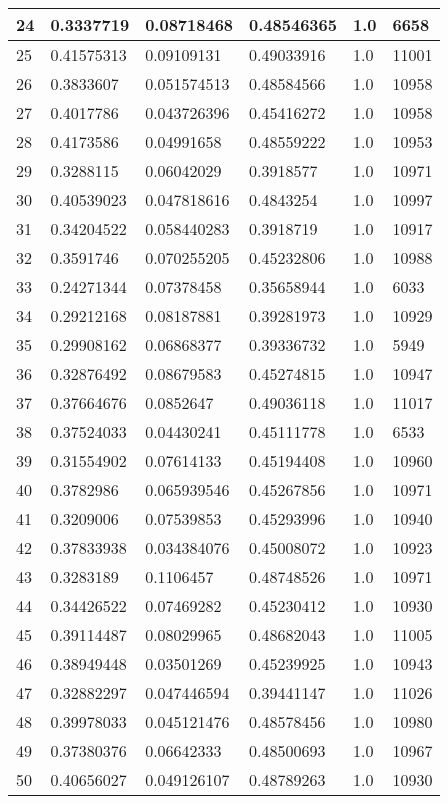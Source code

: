 \begin{longtable}{|l|l|l|l|l|l|}
24 & 0.3337719 & 0.08718468 & 0.48546365 & 1.0 & 6658 \\ \hline 
25 & 0.41575313 & 0.09109131 & 0.49033916 & 1.0 & 11001 \\ \hline 
26 & 0.3833607 & 0.051574513 & 0.48584566 & 1.0 & 10958 \\ \hline 
27 & 0.4017786 & 0.043726396 & 0.45416272 & 1.0 & 10958 \\ \hline 
28 & 0.4173586 & 0.04991658 & 0.48559222 & 1.0 & 10953 \\ \hline 
29 & 0.3288115 & 0.06042029 & 0.3918577 & 1.0 & 10971 \\ \hline 
30 & 0.40539023 & 0.047818616 & 0.4843254 & 1.0 & 10997 \\ \hline 
31 & 0.34204522 & 0.058440283 & 0.3918719 & 1.0 & 10917 \\ \hline 
32 & 0.3591746 & 0.070255205 & 0.45232806 & 1.0 & 10988 \\ \hline 
33 & 0.24271344 & 0.07378458 & 0.35658944 & 1.0 & 6033 \\ \hline 
34 & 0.29212168 & 0.08187881 & 0.39281973 & 1.0 & 10929 \\ \hline 
35 & 0.29908162 & 0.06868377 & 0.39336732 & 1.0 & 5949 \\ \hline 
36 & 0.32876492 & 0.08679583 & 0.45274815 & 1.0 & 10947 \\ \hline 
37 & 0.37664676 & 0.0852647 & 0.49036118 & 1.0 & 11017 \\ \hline 
38 & 0.37524033 & 0.04430241 & 0.45111778 & 1.0 & 6533 \\ \hline 
39 & 0.31554902 & 0.07614133 & 0.45194408 & 1.0 & 10960 \\ \hline 
40 & 0.3782986 & 0.065939546 & 0.45267856 & 1.0 & 10971 \\ \hline 
41 & 0.3209006 & 0.07539853 & 0.45293996 & 1.0 & 10940 \\ \hline 
42 & 0.37833938 & 0.034384076 & 0.45008072 & 1.0 & 10923 \\ \hline 
43 & 0.3283189 & 0.1106457 & 0.48748526 & 1.0 & 10971 \\ \hline 
44 & 0.34426522 & 0.07469282 & 0.45230412 & 1.0 & 10930 \\ \hline 
45 & 0.39114487 & 0.08029965 & 0.48682043 & 1.0 & 11005 \\ \hline 
46 & 0.38949448 & 0.03501269 & 0.45239925 & 1.0 & 10943 \\ \hline 
47 & 0.32882297 & 0.047446594 & 0.39441147 & 1.0 & 11026 \\ \hline 
48 & 0.39978033 & 0.045121476 & 0.48578456 & 1.0 & 10980 \\ \hline 
49 & 0.37380376 & 0.06642333 & 0.48500693 & 1.0 & 10967 \\ \hline 
50 & 0.40656027 & 0.049126107 & 0.48789263 & 1.0 & 10930 \\ \hline 
\end{longtable}